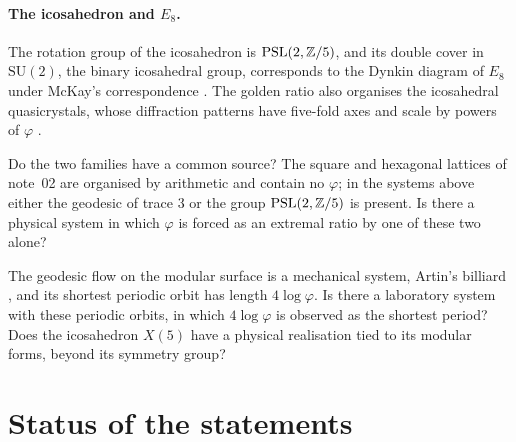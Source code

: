 \documentclass[11pt]{article}
\begin{document}
\paragraph{The icosahedron and $E_8$.}
The rotation group of the icosahedron is $\mathrm{PSL}(2,\mathbb{Z}/5)$, and its double cover in $\mathrm{SU}(2)$, the binary icosahedral group, corresponds to the Dynkin diagram of $E_8$ under McKay's correspondence \cite{McKay}.
The golden ratio also organises the icosahedral quasicrystals, whose diffraction patterns have five-fold axes and scale by powers of $\varphi$ \cite{Shechtman}.

\begin{question}
Do the two families have a common source?
The square and hexagonal lattices of note~02 are organised by arithmetic and contain no $\varphi$; in the systems above either the geodesic of trace 3 or the group $\mathrm{PSL}(2,\mathbb{Z}/5)$ is present.
Is there a physical system in which $\varphi$ is forced as an extremal ratio by one of these two alone?
\end{question}

\begin{question}
The geodesic flow on the modular surface is a mechanical system, Artin's billiard \cite{Artin}, and its shortest periodic orbit has length $4\log\varphi$.
Is there a laboratory system with these periodic orbits, in which $4\log\varphi$ is observed as the shortest period?
Does the icosahedron $X(5)$ have a physical realisation tied to its modular forms, beyond its symmetry group?
\end{question}

\section*{Status of the statements}
\end{document}
